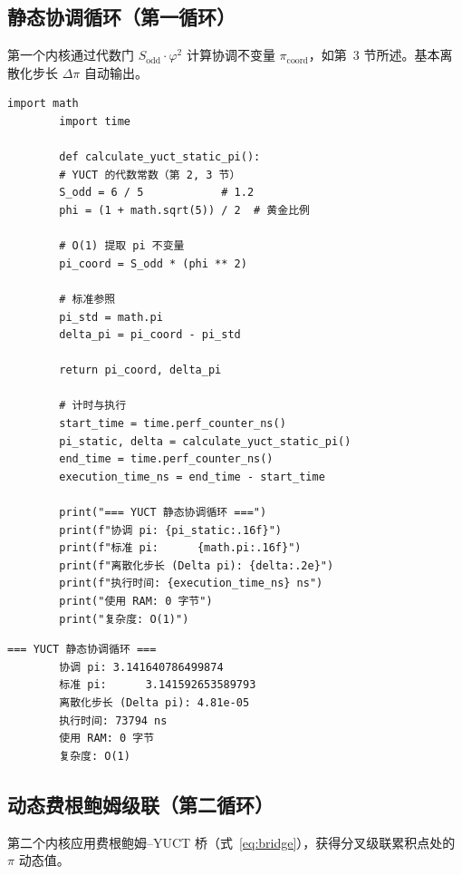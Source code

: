 \documentclass[12pt,a4paper]{article}
\begin{document}
	\subsection{静态协调循环（第一循环）}
	第一个内核通过代数门 $S_{\mathrm{odd}}\cdot\varphi^2$ 计算协调不变量 $\pi_{\mathrm{coord}}$，如第~3 节所述。基本离散化步长 $\Delta\pi$ 自动输出。
	
	\begin{lstlisting}[caption={静态 $\pi$ 不变量的 YUCT 内核}]
		import math
		import time
		
		def calculate_yuct_static_pi():
		# YUCT 的代数常数（第 2, 3 节）
		S_odd = 6 / 5            # 1.2
		phi = (1 + math.sqrt(5)) / 2  # 黄金比例
		
		# O(1) 提取 pi 不变量
		pi_coord = S_odd * (phi ** 2)
		
		# 标准参照
		pi_std = math.pi
		delta_pi = pi_coord - pi_std
		
		return pi_coord, delta_pi
		
		# 计时与执行
		start_time = time.perf_counter_ns()
		pi_static, delta = calculate_yuct_static_pi()
		end_time = time.perf_counter_ns()
		execution_time_ns = end_time - start_time
		
		print("=== YUCT 静态协调循环 ===")
		print(f"协调 pi: {pi_static:.16f}")
		print(f"标准 pi:      {math.pi:.16f}")
		print(f"离散化步长 (Delta pi): {delta:.2e}")
		print(f"执行时间: {execution_time_ns} ns")
		print("使用 RAM: 0 字节")
		print("复杂度: O(1)")
	\end{lstlisting}
	
	\begin{lstlisting}[style=output, caption={静态内核执行输出}]
		=== YUCT 静态协调循环 ===
		协调 pi: 3.141640786499874
		标准 pi:      3.141592653589793
		离散化步长 (Delta pi): 4.81e-05
		执行时间: 73794 ns
		使用 RAM: 0 字节
		复杂度: O(1)
	\end{lstlisting}
	
	\subsection{动态费根鲍姆级联（第二循环）}
	第二个内核应用费根鲍姆–YUCT 桥（式~\ref{eq:bridge}），获得分叉级联累积点处的 $\pi$ 动态值。
	
\end{document}
